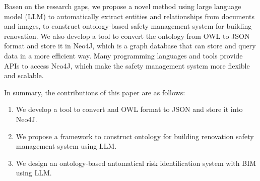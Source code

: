 Basen on the research gaps, we propose a novel method using large language model (LLM) to automatically extract entities and relationships from documents and images,
to construct ontology-based safety management system for building renovation.
We also develop a tool to convert the ontology from OWL to JSON format and store it in Neo4J, which is a graph database that can store and query data in a more efficient way.
Many programming languages and tools provide APIs to access Neo4J, which make the safety management system more flexible and scalable.

In summary, the contributions of this paper are as follows:
\begin{enumerate}
    \item We develop a tool to convert and OWL format to JSON and store it into Neo4J.
    \item We propose a framework to construct ontology for building renovation safety management system using LLM.
    \item We design an ontology-based antomatical risk identification system with BIM using LLM.
\end{enumerate}


